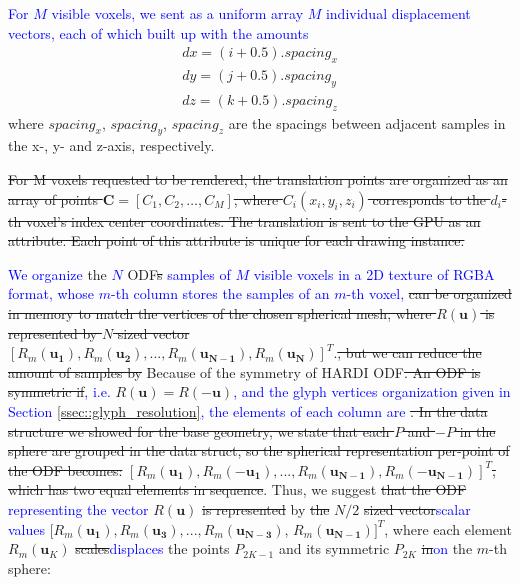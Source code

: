 \documentclass[twoside,twocolumn,10pt]{article}
\begin{document}
\textcolor{blue}{For $M$ visible voxels, we sent as a uniform array $M$ individual displacement vectors, each of which built up with the amounts}
\begin{align}
 \label{eq::translation}
    dx = (i + 0.5).spacing_x \nonumber\\
    dy = (j + 0.5).spacing_y \\
    dz = (k + 0.5).spacing_z \nonumber
\end{align}
where $spacing_x$, $spacing_y$, $spacing_z$ are the spacings between adjacent samples in the x-, y- and z-axis, respectively.

\sout{For M voxels requested to be rendered, the translation points are organized as an array of points $\bm{C} = [C_1,C_2, \dots, C_M]$, where $C_i(x_i, y_i, z_i)$ corresponds to the $d_i$-th voxel's index center coordinates. The translation is sent to the GPU as an attribute. Each point of this attribute is unique for each drawing instance.}





\textcolor{blue}{We organize} the \textcolor{blue}{$N$} ODF\sout{s} \textcolor{blue}{samples of $M$ visible voxels in a 2D texture of RGBA format, whose $m$-th column stores the samples of an $m$-th voxel,} \sout{can be organized in memory to match the vertices of the chosen spherical mesh, where  $R(\bm{u})$ is represented by $N$ sized vector} $[R_m(\bm{u_1}), R_m(\bm{u_2}), ..., R_m(\bm{u_{N-1}}), R_m(\bm{u_{N}})]^T$.\sout{, but we can reduce the amount of samples by} Because of the symmetry of HARDI ODF\sout{. 
An ODF is symmetric if}\textcolor{blue}{, i.e.} $R(\bm{u}) = R(-\bm{u})$\textcolor{blue}{, and the glyph vertices organization given in Section \ref{ssec::glyph_resolution}, the elements of each column are} \sout{. In the data structure we showed for the base geometry, we state that each $P$ and $-P$ in the sphere are grouped in the data struct, so the spherical representation per-point of the ODF becomes:} $[R_m(\bm{u_1}), R_m(-\bm{u_1}), ..., R_m(\bm{u_{N-1}}), R_m(-\bm{u_{N-1}})]^T$\sout{, which has two equal elements in sequence}. Thus, we suggest \sout{that the ODF} \textcolor{blue}{representing the vector} $R(\bm{u})$ \sout{is represented} by \sout{the} $N/2$ \sout{sized vector}\textcolor{blue}{scalar values} $[R_m(\bm{u_1}), R_m(\bm{u_3}), ..., R_m(\bm{u_{N-3}})$, $R_m(\bm{u_{N-1}})]^T$, where each element $R_m(\bm{u}_{K})$ \sout{scales}\textcolor{blue}{displaces} the points $P_{2K-1}$ and its symmetric $P_{2K}$ \sout{in}\textcolor{blue}{on} the $m$-th sphere:
\end{document}
